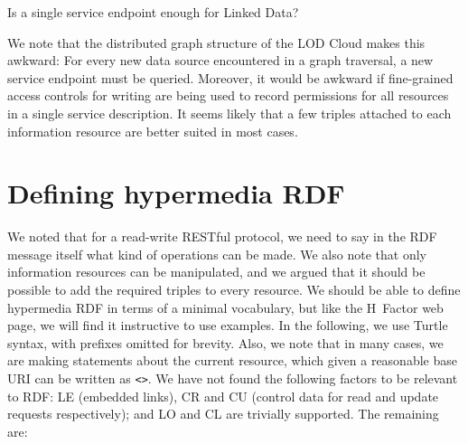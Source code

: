 \documentclass{llncs}
\begin{document}
\begin{question}
Is a single service endpoint enough for Linked Data?
\end{question}

We note that the distributed graph structure of the LOD Cloud makes
this awkward: For every new data source encountered in a graph
traversal, a new service endpoint must be queried. Moreover, it would
be awkward if fine-grained access controls for writing are being used
to record permissions for all resources in a single service
description. It seems likely that a few triples attached to each
information resource are better suited in most cases.

\section{Defining hypermedia RDF}

We noted that for a read-write RESTful protocol, we need to say in the
RDF message itself what kind of operations can be made. We also note
that only information resources can be manipulated, and we argued that
it should be possible to add the required triples to every
resource. We should be able to define hypermedia RDF in terms of a
minimal vocabulary, but like the H~Factor web page, we will find it
instructive to use examples. In the following, we use Turtle syntax,
with prefixes omitted for brevity. Also, we note that in many cases,
we are making statements about the current resource, which given a
reasonable base URI can be written as \texttt{<>}. We have not found
the following factors to be relevant to RDF: \textsf{LE} (embedded
links), \textsf{CR} and \textsf{CU} (control data for read and update
requests respectively); and \textsf{LO} and \textsf{CL} are trivially
supported. The remaining are:
\end{document}
